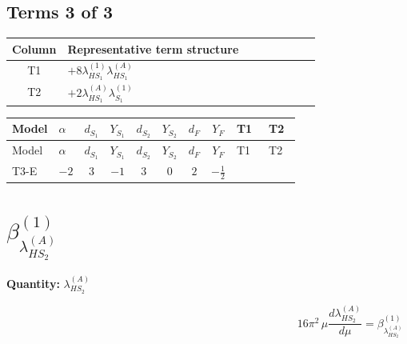 \documentclass[8pt]{article}
\begin{document}
\begin{landscape}
\subsection*{Terms 3 of 3}
\begin{center}
\begin{tabular}{@{}c >{\raggedright\arraybackslash}p{0.82\linewidth}@{}}
\toprule
Column & Representative term structure \\
\midrule
T1 & \(\displaystyle +8 {\lambda_{HS_1}^{(1)}} {\lambda_{HS_1}^{(A)}}\) \\
\midrule
T2 & \(\displaystyle +2 {\lambda_{HS_1}^{(A)}} {\lambda_{S_1}^{(1)}}\) \\
\midrule
\bottomrule
\end{tabular}
\end{center}
\smallskip
\tiny
\begin{longtable}{@{}llcccccc >{\raggedright\arraybackslash}p{0.21\linewidth} >{\raggedright\arraybackslash}p{0.21\linewidth}@{}}
\toprule
Model & $\alpha$ & $d_{S_1}$ & $Y_{S_1}$ & $d_{S_2}$ & $Y_{S_2}$ & $d_F$ & $Y_F$ & T1 & T2 \\
\midrule
\endfirsthead
\toprule
Model & $\alpha$ & $d_{S_1}$ & $Y_{S_1}$ & $d_{S_2}$ & $Y_{S_2}$ & $d_F$ & $Y_F$ & T1 & T2 \\
\midrule
\endhead
T3-E & $-2$ & $3$ & $-1$ & $3$ & $0$ & $2$ & $-\frac{1}{2}$ & \scriptsize\adjustbox{max width=\linewidth}{$\begin{gathered} +8 {\lambda_{HS_1}^{(1)}} {\lambda_{HS_1}^{(A)}}\end{gathered}$} & \scriptsize\adjustbox{max width=\linewidth}{$\begin{gathered} +2 {\lambda_{HS_1}^{(A)}} {\lambda_{S_1}^{(1)}}\end{gathered}$} \\
\midrule
\bottomrule
\end{longtable}
\clearpage
\section*{$\beta_{\lambda_{HS_2}^{(A)}}^{(1)}$}
\noindent\textbf{Quantity: }$\lambda_{HS_2}^{(A)}$\par\smallskip
\[16\pi^2\,\mu\frac{d \lambda_{HS_2}^{(A)}}{d\mu}=\beta_{\lambda_{HS_2}^{(A)}}^{(1)}\]

\end{landscape}
\end{document}
